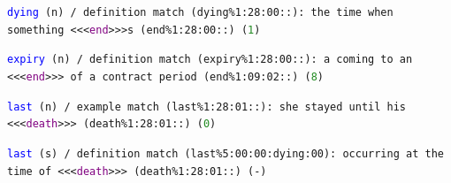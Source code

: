 \documentclass[12pt,a4paper]{article}
\begin{document}
{%


\texttt{\textcolor{blue}{dying} (n) / definition match (dying\%1:28:00::): the time when something <<<\textcolor{purple}{end}>>>s (end\%1:28:00::) (\textcolor{ForestGreen}{1})}

\texttt{\textcolor{blue}{expiry} (n) / definition match (expiry\%1:28:00::): a coming to an <<<\textcolor{purple}{end}>>> of a contract period (end\%1:09:02::) (\textcolor{ForestGreen}{8})}

\texttt{\textcolor{blue}{last} (n) / example match (last\%1:28:01::): she stayed until his <<<\textcolor{purple}{death}>>> (death\%1:28:01::) (\textcolor{ForestGreen}{0})}

\texttt{\textcolor{blue}{last} (s) / definition match (last\%5:00:00:dying:00): occurring at the time of <<<\textcolor{purple}{death}>>> (death\%1:28:01::) (-)}

}
\end{document}
